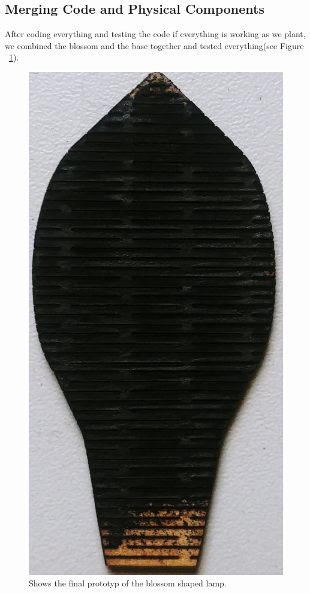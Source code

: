 \documentclass[04_projectProcess.tex]{subfiles}
\begin{document}
    \subsection{Merging Code and Physical Components}
    \begin{flushleft}
        After coding everything and testing the code if everything is working as we plant, we combined
        the blossom and the base together and tested everything(see Figure ~\ref{fig:finalPrototyp}).

        \begin{figure}[h!]
            \centering
            \includegraphics[scale=0.05]{images/materialProcess/07_LaserCut.jpg}
            \caption{Shows the final prototyp of the blossom shaped lamp.}
            \label{fig:finalPrototyp}
        \end{figure}
    \end{flushleft}
\end{document}
